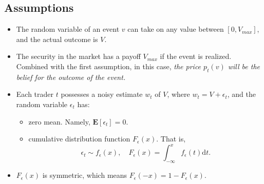 \documentclass{article}
\begin{document}
\subsection*{Assumptions}
\begin{itemize}
    \item The random variable of an event $v$ can take on any value between $[0, V_{max}]$, and the actual outcome is $V$.
    \item The security in the market has a payoff $V_{max}$ if the event is realized. Combined with the first assumption, in this case, \textit{the price $p_t(v)$ will be the belief for the outcome of the event.}
    \item Each trader $t$ possesses a noisy estimate $w_t$ of $V$, where $w_t=V+\epsilon_t$, and the random variable $\epsilon_t$ has: \begin{itemize}[label=$\circ$]
              \item zero mean. Namely, $\mathbf{E}[\epsilon_t]=0$.
              \item cumulative distribution function $F_\epsilon(x)$. That is, \[ \epsilon_t\sim f_\epsilon(x),\quad F_\epsilon(x)=\int_{-\infty}^{x}f_\epsilon(t)\mathrm{d}t. \]
          \end{itemize}
    \item $F_\epsilon(x)$ is symmetric, which means $F_\epsilon(-x)=1-F_\epsilon(x)$.
\end{itemize}
\end{document}
